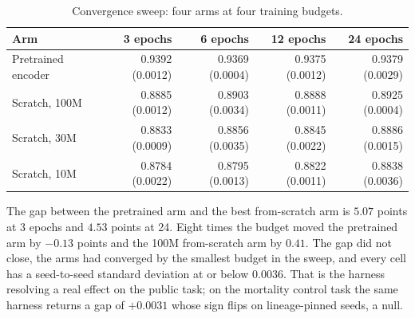 \begin{table}[H]
\caption[Convergence sweep across training budgets]{Convergence sweep: four arms at four training budgets.}
\centering
\small
\begin{tabular}{lrrrr}
\toprule
\textbf{Arm} & \textbf{3 epochs} & \textbf{6 epochs} & \textbf{12 epochs} &
\textbf{24 epochs} \\
\midrule
Pretrained encoder & 0.9392 (0.0012) & 0.9369 (0.0004) & 0.9375 (0.0012) & 0.9379 (0.0029) \\
Scratch, 100M      & 0.8885 (0.0012) & 0.8903 (0.0034) & 0.8888 (0.0011) & 0.8925 (0.0004) \\
Scratch, 30M       & 0.8833 (0.0009) & 0.8856 (0.0035) & 0.8845 (0.0022) & 0.8886 (0.0015) \\
Scratch, 10M       & 0.8784 (0.0022) & 0.8795 (0.0013) & 0.8822 (0.0011) & 0.8838 (0.0036) \\
\bottomrule
\end{tabular}
\label{tab:conv}
\end{table}

The gap between the pretrained arm and the best from-scratch arm is $5.07$ points
at 3 epochs and $4.53$ points at 24. Eight times the budget moved the pretrained
arm by $-0.13$ points and the 100M from-scratch arm by $0.41$. The gap did not
close, the arms had converged by the smallest budget in the sweep, and every cell
has a seed-to-seed standard deviation at or below $0.0036$. That is the harness
resolving a real effect on the public task; on the mortality control task the
same harness returns a gap of $+0.0031$ whose sign flips on lineage-pinned
seeds, a null.

